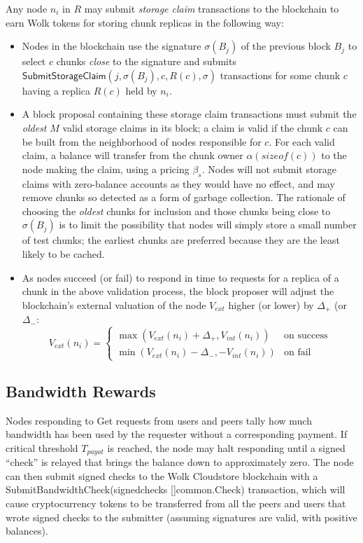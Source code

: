 \documentclass[journal]{IEEEtran}
\newcommand{\tx}[1]{\textsf{#1}}
\begin{document}
Any node $n_i$ in $R$ may submit {\em storage claim} transactions to the blockchain to earn Wolk tokens for storing chunk replicas in the following way:
\begin{itemize}
    \item Nodes in the blockchain use the signature $\sigma(B_j)$ of the previous block $B_j$ to select $c$ chunks {\em close} to the signature and submits $\tx{SubmitStorageClaim}(j, \sigma(B_j), c, R(c), \sigma)$ transactions for some chunk $c$ having a replica $R(c)$ held by $n_i$.
    \item A block proposal containing these storage claim transactions must submit the {\em oldest} $M$ valid storage claims in its block; a claim is valid if the chunk $c$ can be built from the neighborhood of nodes responsible for $c$.  For each valid claim, a balance will transfer from the chunk owner $\alpha(sizeof(c))$ to the node making the claim, using a pricing $\beta_s$.  Nodes will not submit storage claims with zero-balance accounts as they would have no effect, and may remove chunks so detected as a form of garbage collection.   The rationale of choosing the {\em oldest} chunks for inclusion and those chunks being close to $\sigma(B_j)$ is to limit the possibility that nodes will simply store a small number of test chunks; the earliest chunks are preferred because they are the least likely to be cached.
    \item As nodes succeed (or fail) to respond in time to requests for a replica of a chunk in the above validation process, the block proposer will adjust the blockchain's external valuation of the node $V_{ext}$ higher (or lower) by $\Delta_{+}$ (or $\Delta_{-}$:
    \[
    V_{ext}(n_i) = \left\{
    \begin{array}{ll}
    \max(V_{ext}(n_i) + \Delta_{+}, V_{int}(n_i)) & \mbox{on success} \\
    \min(V_{ext}(n_i) - \Delta_{-}, -V_{int}(n_i)) & \mbox{on fail}
    \end{array}
    \right.
    \]
\end{itemize}

\subsection{Bandwidth Rewards}

Nodes responding to \tx{Get} requests from users and peers tally how much bandwidth has been used by the requester without a corresponding payment.  If critical threshold $T_{payat}$ is reached, the node may halt responding until a signed ``check'' is relayed that brings the balance down to approximately zero.   The node can then submit signed checks to the Wolk Cloudstore blockchain with a \tx{SubmitBandwidthCheck(signedchecks []common.Check)} transaction, which will cause cryptocurrency tokens to be transferred from all the peers and users that wrote signed checks to the submitter (assuming signatures are valid, with positive balances).
\end{document}
